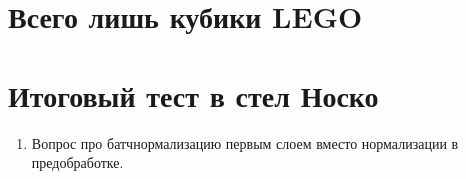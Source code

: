 \documentclass[12pt, a4paper, oneside]{article}
\theoremstyle{plain} %
\theoremstyle{definition}
\begin{document}
	
	





\section{Всего лишь кубики LEGO} 




\section{Итоговый тест в стел Носко}

\begin{enumerate} 
\item Вопрос про батчнормализацию первым слоем вместо нормализации в предобработке. 

\end{enumerate}
\end{document}
